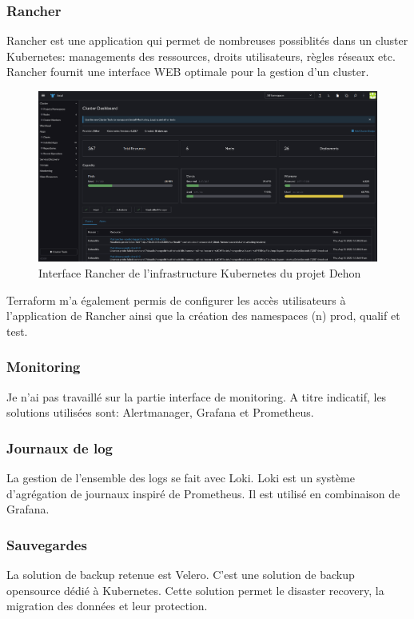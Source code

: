 \documentclass[12pt, a4paper, twoside]{article}
\begin{document}
\subsubsection{Rancher}
Rancher est une application qui permet de nombreuses possiblités dans un \gls{cluster} \gls{Kubernetes}: managements des ressources, droits utilisateurs, règles réseaux etc. 
Rancher fournit une interface WEB optimale pour la gestion d'un \gls{cluster}.

\begin{figure}[!ht]
    \centering
        \includegraphics[width=\textwidth]{src/interface_rancher.png}
    \caption{Interface Rancher de l'infrastructure \gls{Kubernetes} du projet Dehon}
    \label{fig:rancher_interface}
\end{figure}

\gls{Terraform} m'a également permis de configurer les accès utilisateurs à l'application de Rancher ainsi que la création des namespaces (n) prod, qualif et test.

\subsubsection{Monitoring}
Je n'ai pas travaillé sur la partie interface de monitoring.
A titre indicatif, les solutions utilisées sont: Alertmanager, Grafana et Prometheus.

\subsubsection{Journaux de log}
La gestion de l'ensemble des logs se fait avec Loki.
Loki est un système d'agrégation de journaux inspiré de Prometheus.
Il est utilisé en combinaison de Grafana.

\subsubsection{Sauvegardes}
La solution de backup retenue est Velero.
C'est une solution de backup opensource dédié à \gls{Kubernetes}.
Cette solution permet le disaster recovery, la migration des données et leur protection.
\end{document}
